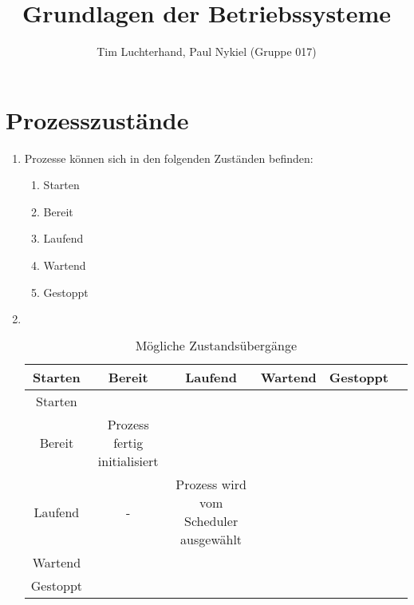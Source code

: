 \documentclass[DIN, pagenumber=false, fontsize=11pt, parskip=half]{scrartcl}
\title{Grundlagen der Betriebssysteme}
\author{Tim Luchterhand, Paul Nykiel (Gruppe 017)}
\begin{document}
    \maketitle
    \section{Prozesszustände}
    \begin{enumerate}[label=(\alph*)]
        \item Prozesse können sich in den folgenden Zuständen befinden:
            \begin{enumerate}
                \item Starten
                \item Bereit
                \item Laufend
                \item Wartend
                \item Gestoppt
            \end{enumerate}
        \item $ $
            \begin{table}[H]
                \centering
                \begin{tabular}{c|ccccc}
                    \toprule 
                    Starten & Bereit & Laufend & Wartend & Gestoppt \\
                    \midrule
                    Starten \\
                    Bereit & Prozess fertig initialisiert \\
                    Laufend & - & Prozess wird vom Scheduler ausgewählt \\
                    Wartend & \\
                    Gestoppt & \\
                    \bottomrule
                \end{tabular}
                \caption{Mögliche Zustandsübergänge}
            \end{table}
    \end{enumerate}
\end{document}
